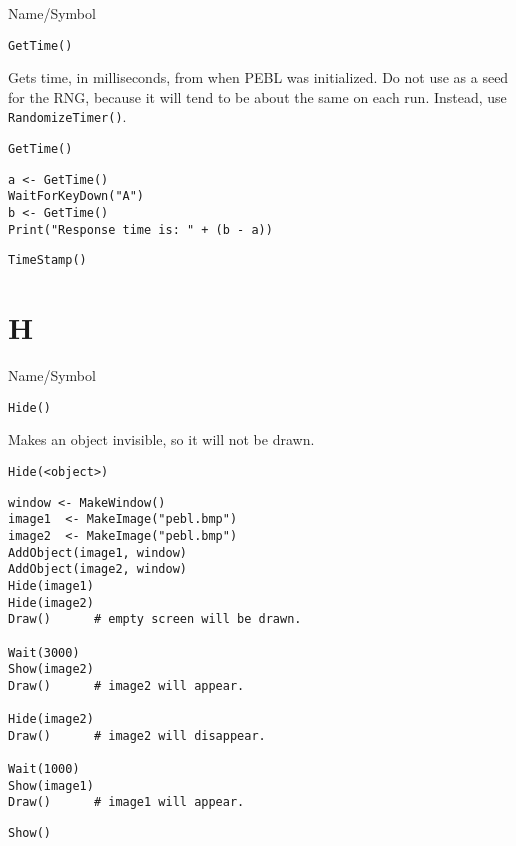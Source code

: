 \rl



\begin{desc}{Name/Symbol}
\item[Name/Symbol]	\verb+GetTime()+

\item[Description] Gets time, in milliseconds, from when PEBL was
  initialized.  Do not use as a seed for the RNG, because it will tend
  to be about the same on each run. Instead, use \verb+RandomizeTimer()+.

\item[Usage]
\begin{verbatim}
GetTime()
\end{verbatim}

\item[Example]
\begin{verbatim}
a <- GetTime()
WaitForKeyDown("A")
b <- GetTime()
Print("Response time is: " + (b - a))
\end{verbatim}

\item[See Also]	\verb+TimeStamp()+
\end{desc}

\rl

\section{H}
\rl



\begin{desc}{Name/Symbol}
\item[Name/Symbol]	\verb+Hide()+ 

\item[Description]	Makes an object invisible, so it will not be drawn.

\item[Usage]
\begin{verbatim}
Hide(<object>)
\end{verbatim}

\item[Example]
\begin{verbatim}
window <- MakeWindow()
image1  <- MakeImage("pebl.bmp")
image2  <- MakeImage("pebl.bmp")
AddObject(image1, window)
AddObject(image2, window)
Hide(image1)
Hide(image2)
Draw()		# empty screen will be drawn.
	
Wait(3000)
Show(image2)
Draw()		# image2 will appear.

Hide(image2)
Draw()		# image2 will disappear.

Wait(1000)
Show(image1)
Draw()		# image1 will appear.
\end{verbatim}
 
\item[See Also]	\verb+Show()+
\end{desc}

